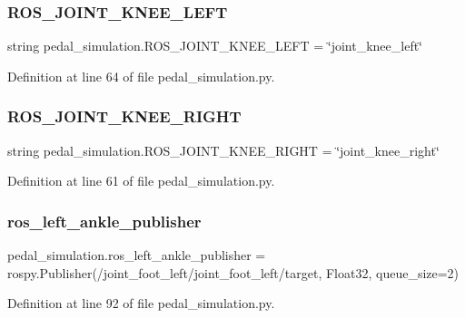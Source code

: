 \subsubsection{\texorpdfstring{ROS\_JOINT\_KNEE\_LEFT}{ROS\_JOINT\_KNEE\_LEFT}}
{\footnotesize\ttfamily string pedal\+\_\+simulation.\+R\+O\+S\+\_\+\+J\+O\+I\+N\+T\+\_\+\+K\+N\+E\+E\+\_\+\+L\+E\+FT = \char`\"{}joint\+\_\+knee\+\_\+left\char`\"{}}



Definition at line 64 of file pedal\+\_\+simulation.\+py.

\mbox{\label{namespacepedal__simulation_ad8c24ef49f1c476e1ad8be5bc4d1c710}} 
\subsubsection{\texorpdfstring{ROS\_JOINT\_KNEE\_RIGHT}{ROS\_JOINT\_KNEE\_RIGHT}}
{\footnotesize\ttfamily string pedal\+\_\+simulation.\+R\+O\+S\+\_\+\+J\+O\+I\+N\+T\+\_\+\+K\+N\+E\+E\+\_\+\+R\+I\+G\+HT = \char`\"{}joint\+\_\+knee\+\_\+right\char`\"{}}



Definition at line 61 of file pedal\+\_\+simulation.\+py.

\mbox{\label{namespacepedal__simulation_a483a606af7f56639dc52ca41b4971059}} 
\subsubsection{\texorpdfstring{ros\_left\_ankle\_publisher}{ros\_left\_ankle\_publisher}}
{\footnotesize\ttfamily pedal\+\_\+simulation.\+ros\+\_\+left\+\_\+ankle\+\_\+publisher = rospy.\+Publisher(\textquotesingle{}/joint\+\_\+foot\+\_\+left/joint\+\_\+foot\+\_\+left/target\textquotesingle{}, Float32, queue\+\_\+size=2)}



Definition at line 92 of file pedal\+\_\+simulation.\+py.

\mbox{\label{namespacepedal__simulation_a2ef1706eba320b87ea0d933416e34266}} 
